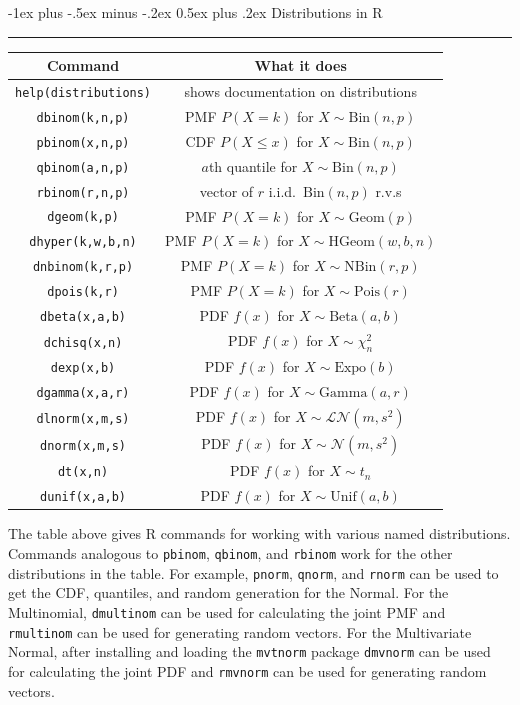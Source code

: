 \documentclass[6pt,landscape]{article}
\makeatletter
\renewcommand{\N}{\mathcal{N}}
\newcommand{\Bin}{\textrm{Bin}}
\newcommand{\Beta}{\textrm{Beta}}
\newcommand{\Gam}{\textrm{Gamma}}
\newcommand{\Expo}{\textrm{Expo}}
\newcommand{\Pois}{\textrm{Pois}}
\newcommand{\Unif}{\textrm{Unif}}
\newcommand{\Geom}{\textrm{Geom}}
\newcommand{\NBin}{\textrm{NBin}}
\newcommand{\HGeom}{\textrm{HGeom}}
\renewcommand{\section}{\@startsection{section}{1}{0mm}%
                                {-1ex plus -.5ex minus -.2ex}%
                                {0.5ex plus .2ex}%
                                {\normalfont\large\bfseries}}
\makeatother
\begin{document}
\begin{multicols*}{3}
\vspace{1.5in}

\section{Distributions in R} \smallskip \hrule height 2pt \smallskip

\bigskip

\begin{center}
\begin{tabular}{cc}
\hline
\textbf{Command} & \textbf{What it does} \\
\hline
\texttt{help(distributions)} & shows documentation on distributions\\
\texttt{dbinom(k,n,p)} & PMF $P(X=k)$ for $X \sim \Bin(n,p)$\\
\texttt{pbinom(x,n,p)} & CDF $P(X \leq x)$ for $X \sim \Bin(n,p)$\\
\texttt{qbinom(a,n,p)} &   $a$th quantile for $X \sim \Bin(n,p)$\\
\texttt{rbinom(r,n,p)} &  vector of $r$ i.i.d.~$\Bin(n,p)$ r.v.s\\
\texttt{dgeom(k,p)} & PMF $P(X=k)$ for $X \sim \Geom(p)$\\
\texttt{dhyper(k,w,b,n)} & PMF $P(X=k)$ for $X \sim \HGeom(w,b,n)$\\
\texttt{dnbinom(k,r,p)} & PMF $P(X=k)$ for $X \sim \NBin(r,p)$\\
\texttt{dpois(k,r)} & PMF $P(X=k)$ for $X \sim \Pois(r)$\\
\texttt{dbeta(x,a,b)} & PDF $f(x)$ for $X \sim \Beta(a,b)$\\
\texttt{dchisq(x,n)} & PDF $f(x)$ for $X \sim \chi^2_n$\\
\texttt{dexp(x,b)} & PDF $f(x)$ for $X \sim \Expo(b)$\\
\texttt{dgamma(x,a,r)} & PDF $f(x)$ for $X \sim \Gam(a,r)$\\
\texttt{dlnorm(x,m,s)} & PDF $f(x)$ for $X \sim \mathcal{LN}(m,s^2)$\\
\texttt{dnorm(x,m,s)} & PDF $f(x)$ for $X \sim \N(m,s^2)$\\
\texttt{dt(x,n)} & PDF $f(x)$ for $X \sim t_n$\\
\texttt{dunif(x,a,b)} & PDF $f(x)$ for $X \sim \Unif(a,b)$\\
\hline
\end{tabular}
\end{center}

The table above gives R commands for working with various named distributions. Commands analogous to \texttt{pbinom}, \texttt{qbinom}, and \texttt{rbinom} work for the other distributions in the table. For example, \texttt{pnorm}, \texttt{qnorm}, and \texttt{rnorm} can be used to get the CDF,  quantiles, and random generation for the Normal.  For the Multinomial, \texttt{dmultinom} can be used for calculating the joint PMF and \texttt{rmultinom} can be used for generating random vectors. For the Multivariate Normal, after installing and loading the \texttt{mvtnorm} package \texttt{dmvnorm} can be used for calculating the joint PDF and \texttt{rmvnorm} can be used for generating random vectors.


\end{multicols*}
\end{document}
